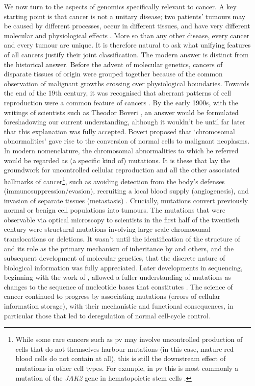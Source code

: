 \documentclass[thesis.tex]{subfiles}
\begin{document}
We now turn to the aspects of genomics specifically relevant to cancer. A key starting point is that cancer is not a unitary disease;  two patients’ tumours may be caused by different processes, occur in different tissues, and have very different molecular and physiological effects \citep{wittekind_tnm_2016}. More so than any other disease, every cancer and every tumour are unique. It is therefore natural to ask what unifying features of all cancers justify their joint classification. The modern answer is distinct from the historical answer. Before the advent of molecular genetics, cancers of disparate tissues of origin were grouped together because of the common observation of malignant growths crossing over physiological boundaries. Towards the end of the 19th century, it was recognised that aberrant patterns of cell reproduction were a common feature of cancers \citep{weinstein_history_2008}. By the early 1900s, with the writings of scientists such as Theodor Boveri \citep[see][for a modern translation]{boveri_concerning_2008}, an answer would be formulated foreshadowing our current understanding, although it wouldn't be until far later that this explanation was fully accepted. Boveri proposed that `chromosomal abnormalities' gave rise to the conversion of normal cells to malignant neoplasms. In modern nomenclature, the chromosomal abnormalities to which he referred would be regarded as (a specific kind of) mutations. It is these that lay the groundwork for uncontrolled cellular reproduction and all the other associated hallmarks of cancer\footnote{While some rare cancers such as \gls{pv} may involve uncontrolled production of cells that do not themselves harbour mutations (in this case, mature red blood cells do not contain  at all), this is still the downstream effect of mutations in other cell types. For example, in \gls{pv} this is most commonly a mutation of the \textit{JAK2} gene in hematopoietic stem cells \citep{tefferi_jak2_2007}.}, such as avoiding detection from the body's defenses (immunosuppression/evasion), recruiting a local blood supply (angiogenesis), and invasion of separate tissues (metastasis) \citep{hanahan_hallmarks_2011}. Crucially, mutations convert previously normal or benign cell populations into tumours. The mutations that were observable via optical microscopy to scientists in the first half of the twentieth century were structural mutations involving large-scale chromosomal translocations or deletions. It wasn't until the identification of the structure of  and its role as the primary mechanism of inheritance by \citet{watson_molecular_1953} and others, and the subsequent development of molecular genetics, that the discrete nature of biological information was fully appreciated. Later developments in  sequencing, beginning with the work of \citet{sanger_dna_1977}, allowed a fuller understanding of mutations as changes to the sequence of nucleotide bases that constitutes . The science of cancer continued to progress by associating  mutations (errors of cellular information storage), with their mechanistic and functional consequences, in particular those that led to deregulation of normal cell-cycle control.
\end{document}
